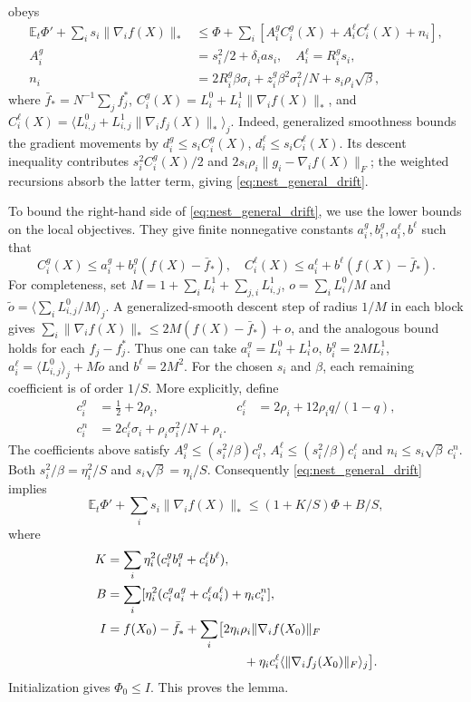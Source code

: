 \begin{codex}
\begin{paperproof}
\[\]
obeys
\begin{align}
 \mathbb E_t\Phi'+\sum_i s_i\|\nabla_i f(X)\|_*
 &\le\Phi+\sum_i\left[A_i^g C_i^g(X)+A_i^\ell C_i^\ell(X)+n_i\right],
 \label{eq:nest_general_drift}\\
 A_i^g&=s_i^2/2+\delta_i a s_i,\quad A_i^\ell=R_i^g s_i,\nonumber\\
 n_i&=2R_i^g\beta\sigma_i+
                 z_i^g\beta^2\sigma_i^2/N+s_i\rho_i\sqrt\beta,\nonumber
\end{align}
where $\bar f_*=N^{-1}\sum_j f_j^*$,
$C_i^g(X)=L_i^0+L_i^1\|\nabla_i f(X)\|_*$, and
$C_i^\ell(X)=\langle L_{i,j}^0+L_{i,j}^1\|\nabla_i f_j(X)\|_*\rangle_j$.
Indeed, generalized smoothness bounds the gradient movements by
$d_i^g\le s_i C_i^g(X)$, $d_i^\ell\le s_i C_i^\ell(X)$.
Its descent inequality contributes $s_i^2C_i^g(X)/2$ and
$2s_i\rho_i\|g_i-\nabla_i f(X)\|_F$; the weighted recursions absorb
the latter term, giving \eqref{eq:nest_general_drift}.

To bound the right-hand side of \eqref{eq:nest_general_drift}, we use the
lower bounds on the local objectives. They give finite nonnegative
constants $a_i^g,b_i^g,a_i^\ell,b^\ell$ such that
\[
 C_i^g(X)\le a_i^g+b_i^g(f(X)-\bar f_*),\quad
 C_i^\ell(X)\le a_i^\ell+b^\ell(f(X)-\bar f_*).
\]
For completeness, set $M=1+\sum_iL_i^1+\sum_{j,i}L_{i,j}^1$,
$o=\sum_i L_i^0/M$ and $\tilde o=\langle\sum_i L_{i,j}^0/M\rangle_j$.
A generalized-smooth descent step of radius $1/M$ in each block gives
$\sum_i\|\nabla_i f(X)\|_*\le2M(f(X)-\bar f_*)+o$,
and the analogous bound holds for each $f_j-f_j^*$.
Thus one can take
$a_i^g=L_i^0+L_i^1o$, $b_i^g=2ML_i^1$,
$a_i^\ell=\langle L_{i,j}^0\rangle_j+M\tilde o$ and $b^\ell=2M^2$.
For the chosen $s_i$ and $\beta$, each remaining coefficient is of order
$1/S$. More explicitly, define
\begin{align*}
 c_i^g&=\tfrac12+2\rho_i,&
 c_i^\ell&=2\rho_i+12\rho_i q/(1-q),\\
 c_i^n&=2c_i^\ell\sigma_i+\rho_i\sigma_i^2/N+\rho_i.
\end{align*}
The coefficients above satisfy
$A_i^g\le(s_i^2/\beta)c_i^g$,
$A_i^\ell\le(s_i^2/\beta)c_i^\ell$ and
$n_i\le s_i\sqrt\beta\,c_i^n$.
Both
$s_i^2/\beta=\eta_i^2/S$ and $s_i\sqrt\beta=\eta_i/S$.
Consequently \eqref{eq:nest_general_drift} implies
\[
 \mathbb E_t\Phi'+\sum_i s_i\|\nabla_i f(X)\|_*
 \le(1+K/S)\Phi+B/S,
\]
where
\begin{align*}
 K&=\sum_i\eta_i^2(c_i^g b_i^g+c_i^\ell b^\ell),\\
 B&=\sum_i[\eta_i^2(c_i^g a_i^g+c_i^\ell a_i^\ell)+\eta_i c_i^n],\\
 I&=f(X_0)-\bar f_*+\sum_i\bigl[2\eta_i\rho_i\|\nabla_i f(X_0)\|_F\\
 &\hspace{38mm}+\eta_i c_i^\ell
                  \langle\|\nabla_i f_j(X_0)\|_F\rangle_j\bigr].
\end{align*}
Initialization gives $\Phi_0\le I$. This proves the lemma.
\end{paperproof}


\end{codex}
